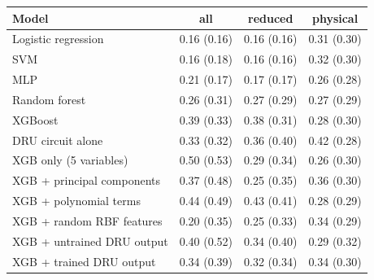 \begin{tabular}{lccc}
\toprule
Model & all & reduced & physical \\
\midrule
Logistic regression & 0.16 (0.16) & 0.16 (0.16) & 0.31 (0.30) \\
SVM & 0.16 (0.18) & 0.16 (0.16) & 0.32 (0.30) \\
MLP & 0.21 (0.17) & 0.17 (0.17) & 0.26 (0.28) \\
Random forest & 0.26 (0.31) & 0.27 (0.29) & 0.27 (0.29) \\
XGBoost & 0.39 (0.33) & 0.38 (0.31) & 0.28 (0.30) \\
DRU circuit alone & 0.33 (0.32) & 0.36 (0.40) & 0.42 (0.28) \\
XGB only (5 variables) & 0.50 (0.53) & 0.29 (0.34) & 0.26 (0.30) \\
XGB + principal components & 0.37 (0.48) & 0.25 (0.35) & 0.36 (0.30) \\
XGB + polynomial terms & 0.44 (0.49) & 0.43 (0.41) & 0.28 (0.29) \\
XGB + random RBF features & 0.20 (0.35) & 0.25 (0.33) & 0.34 (0.29) \\
XGB + untrained DRU output & 0.40 (0.52) & 0.34 (0.40) & 0.29 (0.32) \\
XGB + trained DRU output & 0.34 (0.39) & 0.32 (0.34) & 0.34 (0.30) \\
\bottomrule
\end{tabular}
